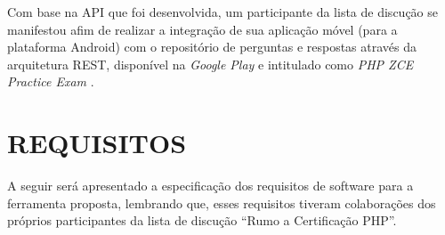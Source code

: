 Com base na \acs{API} que foi desenvolvida, um participante da lista de discução
se manifestou afim de realizar a integração de sua aplicação móvel (para a plataforma
Android) com o repositório de perguntas e respostas através da arquitetura
\ac{REST}, disponível na \textit{Google Play} e intitulado como \textit{PHP ZCE
Practice Exam} \cite{googlePlayPHPZCEPracticeExam}.

\section{REQUISITOS}

A seguir será apresentado a especificação dos requisitos de software para a
ferramenta proposta, lembrando que, esses requisitos tiveram colaborações dos
próprios participantes da lista de discução ``Rumo a Certificação PHP''.

